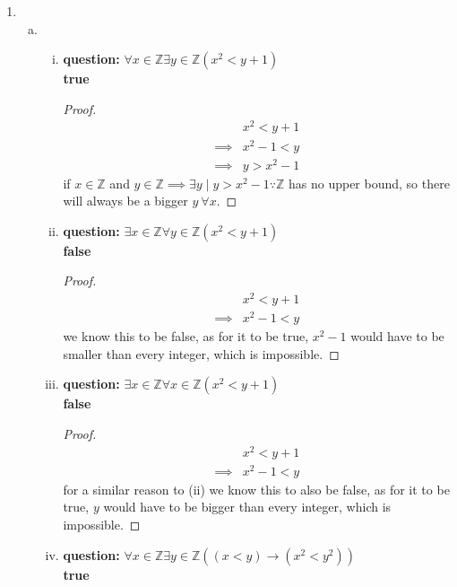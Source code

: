 \documentclass{article}
\begin{document}
\begin{enumerate}
\begin{enumerate}[(a)]
        \end{enumerate}

  \item
  \begin{enumerate}[(a)]
    \item %
    \begin{enumerate}[(i)]
      \item %
      \textbf{question: }\(\forall x\in\mathbb{Z}\exists y\in\mathbb{Z}(x^2<y+1)\)\\
      \textbf{true}
      \begin{proof}
      \begin{align}
       &x^2<y+1\\
       \implies& x^2-1<y\\
       \implies& y>x^2-1
      \end{align}
      if \(x\in \mathbb{Z}\) and \(y\in\mathbb{Z} \implies \exists y \mid y>x^2-1 \because \mathbb{Z}\) has no upper bound, so there will always be a bigger \(y\ \forall x\).
      \end{proof}
      \item %
      \textbf{question: }\(\exists x\in\mathbb{Z}\forall y\in\mathbb{Z}(x^2<y+1)\)\\
      \textbf{false}
      \begin{proof}
      \begin{align}
       &x^2<y+1\\
       \implies&x^2-1<y
      \end{align}
      we know this to be false, as for it to be true, $x^2-1$ would have to be smaller than every integer, which is impossible.
      \end{proof}
      \item %
      \textbf{question: }\(\exists x\in\mathbb{Z}\forall x\in\mathbb{Z}(x^2<y+1)\)\\\textbf{false}
      \begin{proof}
       \begin{align}
        &x^2<y+1\\
       \implies&x^2-1<y
       \end{align}
       for a similar reason to (ii) we know this to also be false, as for it to be true, $y$ would have to be bigger than every integer, which is impossible.
      \end{proof}
      \item
      \textbf{question: }\(\forall x\in\mathbb{Z}\exists y\in\mathbb{Z}((x<y)\to(x^2<y^2))\)\\\textbf{true}

\end{enumerate}
\end{enumerate}
\end{enumerate}
\end{document}
